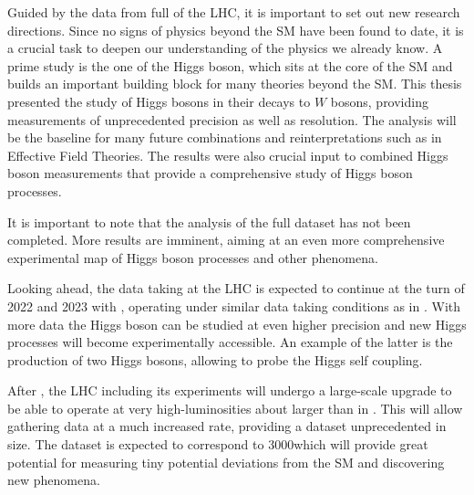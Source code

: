 Guided by the data from full \RunTwo of the LHC, it is important to set out new research directions.
Since no signs of physics beyond the SM have been found to date, it is a crucial task to deepen our understanding of the physics we already know. 
A prime study is the one of the Higgs boson, which sits at the core of the SM and builds an important building block for many theories beyond the SM.
This thesis presented the study of Higgs bosons in their decays to $W$ bosons, providing measurements of unprecedented precision as well as resolution. 
The analysis will be the baseline for many future combinations and reinterpretations such as in Effective Field Theories. 
The results were also crucial input to combined Higgs boson measurements that provide a comprehensive study of Higgs boson processes.


It is important to note that the analysis of the full \RunTwo dataset has not been completed. 
More results are imminent, aiming at an even more comprehensive experimental map of Higgs boson processes and other phenomena. 

Looking ahead, the data taking at the LHC is expected to continue at the turn of 2022 and 2023 with \RunThr, operating under similar data taking conditions as in \RunTwo. 
With more data the Higgs boson can be studied at even higher precision and new Higgs processes will become experimentally accessible. An example of the latter is the production of two Higgs bosons, allowing to probe the Higgs self coupling. 

After \RunThr, the LHC including its experiments will undergo a large-scale upgrade to be able to operate at very high-luminosities about  larger than in \RunTwo. 
This will allow gathering data at a much increased rate, providing a dataset unprecedented in size.
The dataset is expected to correspond to 3000\ifb which will provide great potential for measuring tiny potential deviations from the SM and discovering new phenomena.


